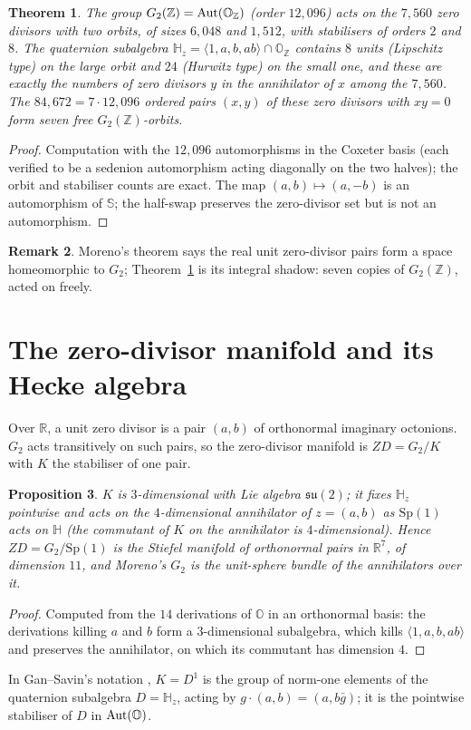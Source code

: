\documentclass[11pt]{amsart}
\newtheorem{theorem}{Theorem}[section]
\newtheorem{proposition}[theorem]{Proposition}
\theoremstyle{definition}
\newtheorem{remark}[theorem]{Remark}
\renewcommand{\O}{\mathbb{O}}\newcommand{\Sd}{\mathbb{S}}\newcommand{\Hq}{\mathbb{H}}\newcommand{\Z}{\mathbb{Z}}\newcommand{\Q}{\mathbb{Q}}\newcommand{\R}{\mathbb{R}}\newcommand{\C}{\mathbb{C}}\newcommand{\F}{\mathbb{F}}
\begin{document}
\begin{theorem}\label{thm:seven}
The group $G_2(\Z)=\Aut(\O_\Z)$ (order $12{,}096$) acts on the $7{,}560$ zero divisors with two orbits, of sizes $6{,}048$ and $1{,}512$, with stabilisers of orders $2$ and $8$. The quaternion subalgebra $\Hq_z=\langle 1,a,b,ab\rangle\cap\O_\Z$ contains $8$ units (Lipschitz type) on the large orbit and $24$ (Hurwitz type) on the small one, and these are exactly the numbers of zero divisors $y$ in the annihilator of $x$ among the $7{,}560$. The $84{,}672=7\cdot 12{,}096$ ordered pairs $(x,y)$ of these zero divisors with $xy=0$ form seven free $G_2(\Z)$-orbits.
\end{theorem}
\begin{proof}
Computation with the $12{,}096$ automorphisms in the Coxeter basis (each verified to be a sedenion automorphism acting diagonally on the two halves); the orbit and stabiliser counts are exact. The map $(a,b)\mapsto(a,-b)$ is an automorphism of $\Sd$; the half-swap preserves the zero-divisor set but is not an automorphism.
\end{proof}
\begin{remark}
Moreno's theorem says the real unit zero-divisor pairs form a space homeomorphic to $G_2$; Theorem~\ref{thm:seven} is its integral shadow: seven copies of $G_2(\Z)$, acted on freely.
\end{remark}

\section{The zero-divisor manifold and its Hecke algebra}\label{sec:hecke}
Over $\R$, a unit zero divisor is a pair $(a,b)$ of orthonormal imaginary octonions. $G_2$ acts transitively on such pairs, so the zero-divisor manifold is $ZD=G_2/K$ with $K$ the stabiliser of one pair.
\begin{proposition}
$K$ is $3$-dimensional with Lie algebra $\mathfrak{su}(2)$; it fixes $\Hq_z$ pointwise and acts on the $4$-dimensional annihilator of $z=(a,b)$ as $\mathrm{Sp}(1)$ acts on $\Hq$ (the commutant of $K$ on the annihilator is $4$-dimensional). Hence $ZD=G_2/\mathrm{Sp}(1)$ is the Stiefel manifold of orthonormal pairs in $\R^7$, of dimension $11$, and Moreno's $G_2$ is the unit-sphere bundle of the annihilators over it.
\end{proposition}
\begin{proof}
Computed from the $14$ derivations of $\O$ in an orthonormal basis: the derivations killing $a$ and $b$ form a $3$-dimensional subalgebra, which kills $\langle 1,a,b,ab\rangle$ and preserves the annihilator, on which its commutant has dimension $4$.
\end{proof}
In Gan--Savin's notation \cite{GanSavin}, $K=D^1$ is the group of norm-one elements of the quaternion subalgebra $D=\Hq_z$, acting by $g\cdot(a,b)=(a,b\bar g)$; it is the pointwise stabiliser of $D$ in $\Aut(\O)$.
\end{document}

